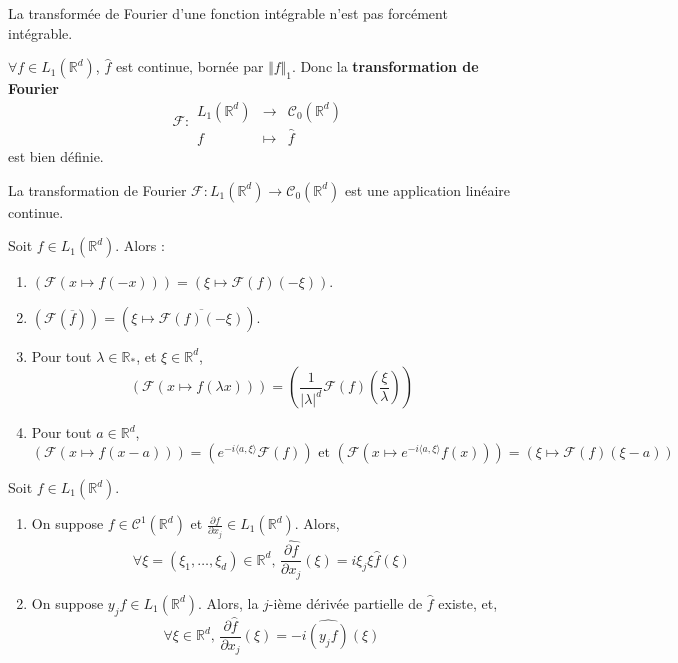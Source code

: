 	\begin{remark}
		La transformée de Fourier d'une fonction intégrable n'est pas forcément intégrable.
	\end{remark}

	\begin{theorem}
		$\forall f \in L_1(\mathbb{R}^d)$, $\widehat{f}$ est continue, bornée par $\Vert f \Vert_1$. Donc la \textbf{transformation de Fourier}
		\[
		\mathcal{F} :
		\begin{array}{ccc}
			L_1(\mathbb{R}^d) &\rightarrow& \mathcal{C}_0(\mathbb{R}^d) \\
			f &\mapsto& \widehat{f}
		\end{array}
		\]
		est bien définie.
	\end{theorem}

	\begin{corollary}
		La transformation de Fourier $\mathcal{F} : L_1(\mathbb{R}^d) \rightarrow \mathcal{C}_0(\mathbb{R}^d)$ est une application linéaire continue.
	\end{corollary}

	\begin{proposition}
		Soit $f \in L_1(\mathbb{R}^d)$. Alors :
		\begin{enumerate}[label=(\roman*)]
			\item $(\mathcal{F}(x \mapsto f(-x))) = (\xi \mapsto \mathcal{F}(f)(-\xi))$.
			\item $(\mathcal{F}(\overline{f})) = (\xi \mapsto \overline{\mathcal{F}(f)(-\xi)})$.
			\item Pour tout $\lambda \in \mathbb{R}_*$, et $\xi \in \mathbb{R}^d$,
			\[ (\mathcal{F}(x \mapsto f(\lambda x))) = (\frac{1}{\vert \lambda \vert^d} \mathcal{F}(f) \left( \frac{\xi}{\lambda} \right)) \]
			\item Pour tout $a \in \mathbb{R}^d$,
			\[ (\mathcal{F}(x \mapsto f(x - a))) = (e^{-i \langle a, \xi \rangle} \mathcal{F}(f)) \text{ et } (\mathcal{F}(x \mapsto e^{-i \langle a, \xi \rangle} f(x))) = (\xi \mapsto \mathcal{F}(f)(\xi - a)) \]
		\end{enumerate}
	\end{proposition}

	\reference{120}

	\begin{proposition}
		Soit $f \in L_1(\mathbb{R}^d)$.
		\begin{enumerate}[label=(\roman*)]
			\item On suppose $f \in \mathcal{C}^1(\mathbb{R}^d)$ et $\frac{\partial f}{\partial x_j} \in L_1(\mathbb{R}^d)$. Alors,
			\[ \forall \xi = (\xi_1, \dots, \xi_d) \in \mathbb{R}^d, \, \widehat{\frac{\partial f}{\partial x_j}}(\xi) = i \xi_j \xi \widehat{f}(\xi) \]
			\item On suppose $y_j f \in L_1(\mathbb{R}^d)$. Alors, la $j$-ième dérivée partielle de $\widehat{f}$ existe, et,
			\[ \forall \xi \in \mathbb{R}^d, \, \frac{\partial \widehat{f}}{\partial x_j}(\xi) = -i \widehat{(y_j f)}(\xi) \]
		\end{enumerate}
	\end{proposition}

